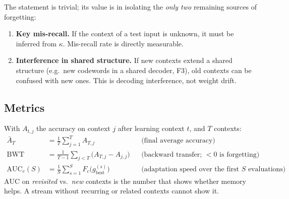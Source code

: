 \documentclass[11pt,a4paper]{article}
\theoremstyle{definition}
\theoremstyle{plain}
\theoremstyle{remark}
\begin{document}
The statement is trivial; its value is in isolating the \emph{only two} remaining sources of forgetting:
\begin{enumerate}
\item \textbf{Key mis-recall.} If the context of a test input is unknown, it must be inferred from $\kappa$. Mis-recall rate is directly measurable.
\item \textbf{Interference in shared structure.} If new contexts extend a shared structure (e.g.\ new codewords in a shared decoder, F3), old contexts can be confused with new ones. This is decoding interference, not weight drift.
\end{enumerate}

\subsection{Metrics}

With $A_{t,j}$ the accuracy on context $j$ after learning context $t$, and $T$ contexts:
\begin{align}
\bar A_T &= \frac1T\sum_{j=1}^T A_{T,j} &&\text{(final average accuracy)}\\
\mathrm{BWT} &= \frac{1}{T-1}\sum_{j<T}\big(A_{T,j} - A_{j,j}\big) &&\text{(backward transfer; } < 0 \text{ is forgetting)}\\
\mathrm{AUC}_c(S) &= \frac1S\sum_{s=1}^{S} F_c\big(g^{(s)}_{\text{best}}\big) &&\text{(adaptation speed over the first } S \text{ evaluations)}
\end{align}
$\mathrm{AUC}$ on \emph{revisited} vs.\ \emph{new} contexts is the number that shows whether memory helps. A stream without recurring or related contexts cannot show it.
\end{document}
